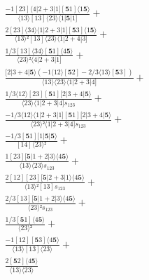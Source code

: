 \documentclass[varwidth, border=5pt]{standalone}
\begin{document}
\begin{my}
$\begin{gathered}
\scriptscriptstyle\frac{-1[23]⟨4|2+3|1][𝟓1]⟨1𝟓⟩}{⟨13⟩[13]⟨23⟩⟨1|𝟓|1]} +\\
\scriptscriptstyle\frac{2[23]⟨34⟩⟨1|2+3|1][𝟓3]⟨1𝟓⟩}{⟨13⟩²[13]⟨23⟩⟨1|2+4|3]} +\\
\scriptscriptstyle\frac{1/3[13]⟨34⟩[𝟓1]⟨4𝟓⟩}{⟨23⟩²⟨4|2+3|1]} +\\
\scriptscriptstyle\frac{[2|3+4|𝟓⟩(-1⟨12⟩[𝟓2]-2/3⟨13⟩[𝟓3])}{⟨13⟩⟨23⟩⟨1|2+3|4]} +\\
\scriptscriptstyle\frac{1/3⟨12⟩[23][𝟓1][2|3+4|𝟓⟩}{⟨23⟩⟨1|2+3|4]s_{123}} +\\
\scriptscriptstyle\frac{-1/3⟨12⟩⟨1|2+3|1][𝟓1][2|3+4|𝟓⟩}{⟨23⟩²⟨1|2+3|4]s_{123}} +\\
\scriptscriptstyle\frac{-1/3[𝟓1][1|𝟓|𝟓⟩}{[14]⟨23⟩²} +\\
\scriptscriptstyle\frac{1[23][𝟓|1+2|3⟩⟨4𝟓⟩}{⟨13⟩⟨23⟩s_{123}} +\\
\scriptscriptstyle\frac{2[12][23][𝟓|2+3|1⟩⟨4𝟓⟩}{⟨13⟩²[13]s_{123}} +\\
\scriptscriptstyle\frac{2/3[13][𝟓|1+2|3⟩⟨4𝟓⟩}{⟨23⟩²s_{123}} +\\
\scriptscriptstyle\frac{1/3[𝟓1]⟨4𝟓⟩}{⟨23⟩²} +\\
\scriptscriptstyle\frac{-1[12][𝟓3]⟨4𝟓⟩}{⟨13⟩[13]⟨23⟩} +\\
\scriptscriptstyle\frac{2[𝟓2]⟨4𝟓⟩}{⟨13⟩⟨23⟩} \phantom{+}
\end{gathered}$
\end{my}
\end{document}
